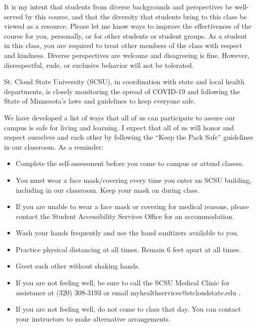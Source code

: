 \documentclass{tufte-handout}
\begin{document}
\begin{fullwidth}
 It is my intent that students from diverse backgrounds and perspectives be well-served by this course, and that the diversity that students bring to this class be viewed as a resource. Please let me know ways to improve the effectiveness of the course for you, personally, or for other students or student groups. As a student in this class, you are required to treat other members of the class with respect and kindness. Diverse perspectives are welcome and disagreeing is fine. However, disrespectful, rude, or exclusive behavior will not be tolerated.



St. Cloud State University (SCSU), in coordination with state and local health departments, is closely monitoring the spread of COVID-19 and following the State of Minnesota’s laws and guidelines to keep everyone safe.

We have developed a list of ways that all of us can participate to assure our campus is safe for living and learning. I expect that all of us will honor and respect ourselves and each other by following the ``Keep the Pack Safe'' guidelines in our classroom. As a reminder:

\begin{itemize}
\item Complete the self-assessment before you come to campus or attend classes.
\item You must wear a face mask/covering every time you enter an SCSU building, including in our classroom. Keep your mask on during class.
\item If you are unable to wear a face mask or covering for medical reasons, please contact the Student Accessibility Services Office for an accommodation.
\item Wash your hands frequently and use the hand sanitizers available to you.
\item Practice physical distancing at all times. Remain 6 feet apart at all times.
\item Greet each other without shaking hands.
\item If you are not feeling well, be sure to call the SCSU Medical Clinic for assistance at (320) 308-3193 or email myhealthservices@stcloudstate.edu .
\item If you are not feeling well, do not come to class that day. You can contact your instructors to make alternative arrangements.
\end{itemize}

\end{fullwidth}
\end{document}

